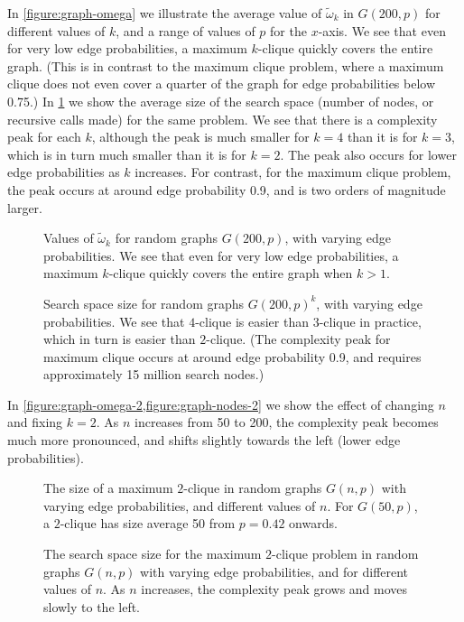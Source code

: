 \documentclass[letterpaper]{article}
\begin{document}
In \cref{figure:graph-omega} we illustrate the average value of $\tilde{\omega}_k$ in $G(200,
p)$ for different values of $k$, and a range of values of $p$ for the $x$-axis. We see that even for
very low edge probabilities, a maximum $k$-clique quickly covers the entire graph.  (This is in contrast to
the maximum clique problem, where a maximum clique does not even cover a quarter of the graph for
edge probabilities below 0.75.) In \cref{figure:graph-nodes} we show the average size of the
search space (number of nodes, or recursive calls made) for the same problem. We see that there is a
complexity peak for each $k$, although the peak is much smaller for $k = 4$ than it is for $k = 3$,
which is in turn much smaller than it is for $k = 2$. The peak also occurs for lower edge
probabilities as $k$ increases. For contrast, for the maximum clique problem, the peak occurs at
around edge probability 0.9, and is two orders of magnitude larger.

\begin{figure}[t]
    \centering
    
    \caption{Values of $\tilde{\omega}_k$ for random graphs $G(200, p)$, with varying edge probabilities.
        We see that even for very low edge probabilities, a maximum $k$-clique
    quickly covers the entire graph when $k > 1$.}
    \label{figure:graph-omega}

    \vspace*{2em}
    \centering
    
    \caption{Search space size for random graphs $G(200, p)^k$, with varying edge probabilities. We see that
        $4$-clique is easier than $3$-clique in practice, which in turn is easier than $2$-clique. (The
        complexity peak for maximum clique occurs at around edge probability 0.9, and requires
        approximately 15 million search nodes.)}
    \label{figure:graph-nodes}
\end{figure}

In \cref{figure:graph-omega-2,figure:graph-nodes-2} we show the effect of
changing $n$ and fixing $k = 2$. As $n$ increases from 50 to 200, the complexity peak becomes much
more pronounced, and shifts slightly towards the left (lower edge probabilities).

\begin{figure}[t]
    \centering
    
    \caption{The size of a maximum $2$-clique in random graphs $G(n, p)$ with varying edge
        probabilities, and different values of $n$. For $G(50, p)$, a $2$-clique has size average 50
    from $p = 0.42$ onwards.}
    \label{figure:graph-omega-2}

    \vspace*{2em}
    \centering
    
    \caption{The search space size for the maximum $2$-clique problem in random graphs $G(n, p)$
        with varying edge probabilities, and for different values of $n$. As $n$ increases, the
    complexity peak grows and moves slowly to the left.}
    \label{figure:graph-nodes-2}
\end{figure}
\end{document}
